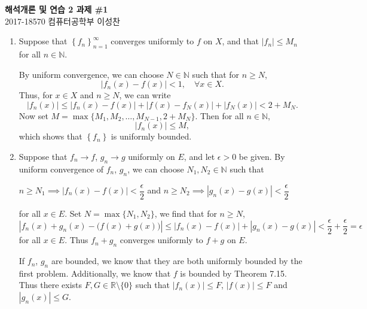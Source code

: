 \documentclass[12pt]{report}
\newcommand{\numl}[1]{\item[\large\textbf{\sffamily #1.}]}
\newcommand{\bs}{\setminus}
\newcommand{\abs}[1]{\left| #1 \right|}
\newcommand{\seq}[1]{\left\{ #1 \right\}}
\newcommand{\ra}{\rightarrow}
\newcommand{\R}{\mathbb{R}}
\newcommand{\N}{\mathbb{N}}
\begin{document}
\begin{center}
    \textbf{\Large 해석개론 및 연습 2 과제 \#1}\\
    \large 2017-18570 컴퓨터공학부 이성찬
\end{center}
\begin{enumerate}
    \numl{1} Suppose that \(\seq{f_n}_{n=1}^\infty\) converges uniformly to \(f\) on \(X\), and that \(\abs{f_n} \leq M_n\) for all \(n \in \N\).

    By uniform convergence, we can choose \(N \in \N\) such that for \(n \geq N\),
    \[
        \abs{f_n(x) - f(x)} < 1, \quad \forall x \in X.
    \]
    Thus, for \(x \in X\) and \(n \geq N\), we can write
    \[
        \abs{f_n(x)} \leq \abs{f_n(x) - f(x)} + \abs{f(x) - f_N(x)} + \abs{f_N(x)} < 2 + M_N.
    \]
    Now set \(M = \max\{M_1, M_2, \dots, M_{N-1}, 2 + M_N\}\). Then for all \(n \in \N\),
    \[
        \abs{f_n(x)} \leq M,
    \]
    which shows that \(\seq{f_n}\) is uniformly bounded.

    \numl{2} Suppose that \(f_n \ra f\), \(g_n \ra g\) uniformly on \(E\), and let \(\epsilon > 0\) be given. By uniform convergence of \(f_n\), \(g_n\), we can choose \(N_1, N_2 \in \N\) such that
    \begin{center}
        \(n \geq N_1 \implies \abs{f_n(x) - f(x)} < \dfrac{\epsilon}{2}\) and \(n \geq N_2 \implies \abs{g_n(x) - g(x)} < \dfrac{\epsilon}{2}\)
    \end{center}
    for all \(x \in E\). Set \(N = \max\{N_1, N_2\}\), we find that for \(n \geq N\),
    \[
        \abs{f_n(x) + g_n(x) - \bigl(f(x) + g(x)\bigr)} \leq \abs{f_n(x) - f(x)} + \abs{g_n(x) - g(x)} < \frac{\epsilon}{2} + \frac{\epsilon}{2} = \epsilon
    \]
    for all \(x \in E\). Thus \(f_n + g_n\) converges uniformly to \(f + g\) on \(E\).

    If \(f_n\), \(g_n\) are bounded, we know that they are both uniformly bounded by the first problem. Additionally, we know that \(f\) is bounded by {\sffamily Theorem 7.15}. Thus there exists \(F, G \in \R \bs \{0\}\) such that \(\abs{f_n(x)} \leq F\), \(\abs{f(x)} \leq F\) and \(\abs{g_n(x)} \leq G\).


\end{enumerate}
\end{document}
